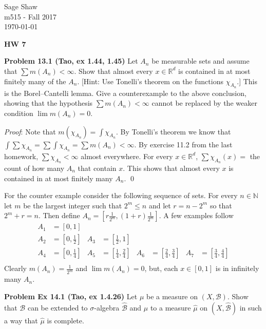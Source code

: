 \documentclass[12pt]{article}
\newcommand{\problem}[1]{\hspace{-4 ex} \large \textbf{Problem #1} }
\renewenvironment{proof}{\hspace{-4 ex} \emph{Proof}:}{\qed}
\newcommand{\RR}{\mathbb{R}}
\newcommand{\NN}{\mathbb{N}}
\begin{document}
	\thispagestyle{empty}
	
	\begin{flushright}
		Sage Shaw \\
		m515 - Fall 2017 \\
		\today
	\end{flushright}
	
{\Large \textbf{HW 7}}\bigbreak

\problem{13.1 (Tao, ex 1.44, 1.45)}
Let $A_n$ be measurable sets and assume that $\sum m(A_n)<\infty$. Show that almost every $x\in\RR^d$ is contained in at most finitely many of the $A_n$. [Hint: Use Tonelli's theorem on the functions $\chi_{A_n}$.] This is the Borel--Cantelli lemma.
Give a counterexample to the above conclusion, showing that the hypothesis $\sum m(A_n)<\infty$ cannot be replaced by the weaker condition $\lim m(A_n)=0$. \bigbreak

	\begin{proof}
		Note that $m(\chi_{A_n}) = \int \chi_{A_n}$. By Tonelli's theorem we know that $\int \sum \chi_{A_n} = \sum \int \chi_{A_n} = \sum m(A_n) < \infty$. By exercise 11.2 from the last homework, $\sum \chi_{A_n} < \infty$ almost everywhere. For every $x \in \RR^d$, $\sum \chi_{A_n}(x) =$ the count of how many $A_n$ that contain $x$. This shows that almost every $x$ is contained in at most finitely many $A_n$. \bigbreak
	\end{proof}

	\bigbreak
	
	For the counter example consider the following sequence of sets. For every $ n \in \NN$ let $m$ be the largest integer such that $2^m \leq n$ and let $r = n - 2^m$ so that $2^m + r = n$. Then define $A_n = [r\tfrac{1}{2^m}, (1+r)\tfrac{1}{2^m}]$. A few examples follow
	\begin{align*}
		A_1 & = [0,1] \\
		A_2 & = [0, \tfrac{1}{2}] & A_3 & = [\tfrac{1}{2}, 1]\\
		A_4 & = [0, \tfrac{1}{4}] & A_5 & = [\tfrac{1}{4}, \tfrac{2}{4}] & A_6 & = [\tfrac{2}{4}, \tfrac{3}{4}] & A_7 & = [\tfrac{3}{4}, \tfrac{4}{4}] \\
	\end{align*}
	Clearly $m(A_n) = \tfrac{1}{2^m}$ and $\lim m(A_n)=0$, but, each $x \in [0,1]$ is in infinitely many $A_n$.

\bigbreak


\problem{Ex 14.1 (Tao, ex 1.4.26)} Let $\mu$ be a measure on $(X,\mathcal B)$. Show that $\mathcal B$ can be extended to $\sigma$-algebra $\hat{\mathcal B}$ and $\mu$ to a measure $\hat\mu$ on $(X,\hat{\mathcal B})$ in such a way that $\hat\mu$ is complete. \bigbreak
\end{document}
